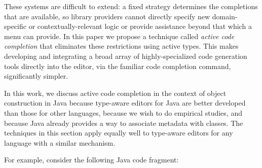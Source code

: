 
These systems are difficult to extend: a fixed strategy determines the completions that are available, so library providers cannot directly specify new domain-specific or contextually-relevant logic or provide assistance beyond that which a menu can provide. 
In this paper we propose a technique called {\it active code completion} that eliminates these restrictions using active types. This  makes developing and integrating a broad array of highly-specialized code generation tools directly into the editor, via the familiar code completion command, significantly simpler.%

In this work, we discuss active code completion in the context of object construction in Java because type-aware editors for Java are better developed than those for other languages, because we wish to do empirical studies, and because Java already provides a way to associate metadata with classes. The techniques in this section apply equally well to type-aware editors for any language with a similar mechanism. 

For example, consider the following Java code fragment:

